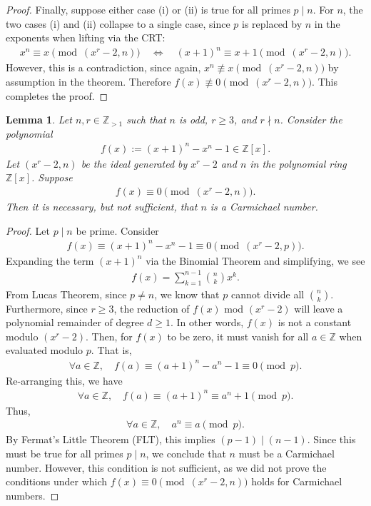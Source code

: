 \documentclass{article}
\theoremstyle{plain}
\newtheorem{lemma}[theorem]{Lemma}
\theoremstyle{definition}
\newcommand{\Z}{\mathbb{Z}}
\begin{document}
\begin{proof}
Finally, suppose either case (i) or (ii) is true for all primes $p \mid n$. For $n$, the two cases (i) and (ii) collapse to a single case, since $p$ is replaced by $n$ in the exponents when lifting via the CRT:
\begin{align*}
x^n \equiv x \pmod{(x^r-2, n)} \quad\Longleftrightarrow\quad (x+1)^n \equiv x+1 \pmod{(x^r-2, n)} .
\end{align*}
However, this is a contradiction, since again, $x^n \not\equiv x \pmod{(x^r-2, n)}$ by assumption in the theorem. Therefore $f(x) \not\equiv 0 \pmod{(x^r-2, n)}$. This completes the proof.
\end{proof}

\begin{lemma} \label{proof:niscarmichaelnumber}
Let $n, r \in \Z_{>1}$ such that $n$ is odd, $r \geq 3$, and $r \nmid n$. Consider the polynomial
\begin{align*}
f(x) := (x+1)^n - x^n - 1 \in \Z[x] .
\end{align*}
Let $(x^r-2, n)$ be the ideal generated by $x^r-2$ and $n$ in the polynomial ring $\Z[x]$. Suppose
\begin{align*}
f(x) \equiv 0 \pmod{(x^r-2, n)} .
\end{align*}
Then it is necessary, but not sufficient, that $n$ is a Carmichael number.
\end{lemma}
\begin{proof}
Let $p \mid n$ be prime. Consider
\begin{align*}
    f(x) \equiv (x+1)^n - x^n - 1 \equiv 0 \pmod{(x^r-2, p)} .
\end{align*}
Expanding the term $(x+1)^n$ via the Binomial Theorem and simplifying, we see
\begin{align*}
    f(x) = \sum_{k=1}^{n-1} \binom{n}{k} x^k .
\end{align*}
From Lucas Theorem, since $p \not= n$, we know that $p$ cannot divide all $\binom{n}{k}$. Furthermore, since $r \geq 3$, the reduction of $f(x)$ mod $(x^r-2)$ will leave a polynomial remainder of degree $d \geq 1$. In other words, $f(x)$ is not a constant modulo $(x^r-2)$. Then, for $f(x)$ to be zero, it must vanish for all $a \in \Z$ when evaluated modulo $p$. That is, 
\begin{align*}
    \forall a \in \Z, \quad f(a) \equiv (a+1)^n - a^n - 1 \equiv 0 \pmod{p} .
\end{align*}
Re-arranging this, we have
\begin{align*}
    \forall a \in \Z, \quad f(a) \equiv (a+1)^n \equiv a^n + 1 \pmod{p} .
\end{align*}
Thus,
\begin{align*}
    \forall a \in \Z, \quad a^n \equiv a \pmod{p} .
\end{align*}
By Fermat's Little Theorem (FLT), this implies $(p-1) \mid (n-1)$. Since this must be true for all primes $p \mid n$, we conclude that $n$ must be a Carmichael number. However, this condition is not sufficient, as we did not prove the conditions under which $f(x) \equiv 0 \pmod{(x^r-2, n)}$ holds for Carmichael numbers.
\end{proof}
\end{document}
